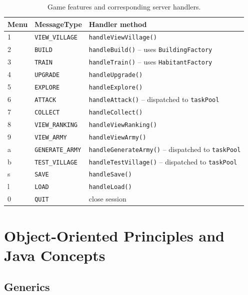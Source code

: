 \documentclass[format=acmsmall, review=false, screen=true]{acmart}
\begin{document}
\begin{table}[h]
  \centering
  \caption{Game features and corresponding server handlers.}
  \label{tbl:features}
  \begin{tabularx}{\linewidth}{llX}
    \toprule
    \textbf{Menu} & \textbf{MessageType} & \textbf{Handler method} \\
    \midrule
    1 & \texttt{VIEW\_VILLAGE}   & \texttt{handleViewVillage()} \\
    2 & \texttt{BUILD}           & \texttt{handleBuild()} -- uses \texttt{BuildingFactory} \\
    3 & \texttt{TRAIN}           & \texttt{handleTrain()} -- uses \texttt{HabitantFactory} \\
    4 & \texttt{UPGRADE}         & \texttt{handleUpgrade()} \\
    5 & \texttt{EXPLORE}         & \texttt{handleExplore()} \\
    6 & \texttt{ATTACK}          & \texttt{handleAttack()} -- dispatched to \texttt{taskPool} \\
    7 & \texttt{COLLECT}         & \texttt{handleCollect()} \\
    8 & \texttt{VIEW\_RANKING}   & \texttt{handleViewRanking()} \\
    9 & \texttt{VIEW\_ARMY}      & \texttt{handleViewArmy()} \\
    a & \texttt{GENERATE\_ARMY}  & \texttt{handleGenerateArmy()} -- dispatched to \texttt{taskPool} \\
    b & \texttt{TEST\_VILLAGE}   & \texttt{handleTestVillage()} -- dispatched to \texttt{taskPool} \\
    s & \texttt{SAVE}            & \texttt{handleSave()} \\
    l & \texttt{LOAD}            & \texttt{handleLoad()} \\
    0 & \texttt{QUIT}            & close session \\
    \bottomrule
  \end{tabularx}
\end{table}

\section{Object-Oriented Principles and Java Concepts}

\subsection{Generics}
\end{document}
